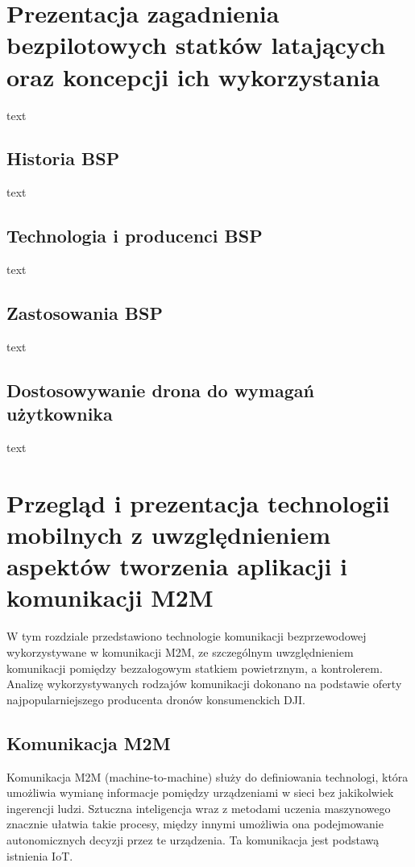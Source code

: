 \documentclass[12pt, a4paper, twoside]{report}
\begin{document}
\chapter{Prezentacja zagadnienia bezpilotowych statków latających oraz koncepcji ich wykorzystania}
\hspace{1cm}text
\section{Historia BSP}
\hspace{1cm}text
\section{Technologia i producenci BSP}
\hspace{1cm}text
\section{Zastosowania BSP}
\hspace{1cm}text
\section{Dostosowywanie drona do wymagań użytkownika}
\hspace{1cm}text


\chapter{Przegląd i prezentacja technologii mobilnych z uwzględnieniem aspektów tworzenia aplikacji i komunikacji M2M}
\hspace{1cm}W tym rozdziale przedstawiono technologie komunikacji bezprzewodowej wykorzystywane w komunikacji M2M, ze szczególnym uwzględnieniem komunikacji pomiędzy bezzałogowym statkiem powietrznym, a kontrolerem. Analizę wykorzystywanych rodzajów komunikacji dokonano na podstawie oferty najpopularniejszego producenta dronów konsumenckich DJI.

\section{Komunikacja M2M}
\hspace{1cm}Komunikacja M2M (machine-to-machine) służy do definiowania technologi, która umożliwia wymianę informacje pomiędzy urządzeniami w sieci bez jakikolwiek ingerencji ludzi. Sztuczna inteligencja wraz z metodami uczenia maszynowego znacznie ułatwia takie procesy, między innymi umożliwia ona podejmowanie autonomicznych decyzji przez te urządzenia. Ta komunikacja jest podstawą istnienia IoT.\cite{m2m-web}
\end{document}
